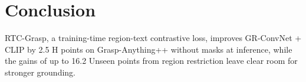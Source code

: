 \section{Conclusion}
\label{sec:conclusion}

RTC-Grasp, a training-time region-text contrastive loss, improves GR-ConvNet + CLIP by 2.5 H points on Grasp-Anything++ without masks at inference, while the gains of up to 16.2 Unseen points from region restriction leave clear room for stronger grounding.
\par
